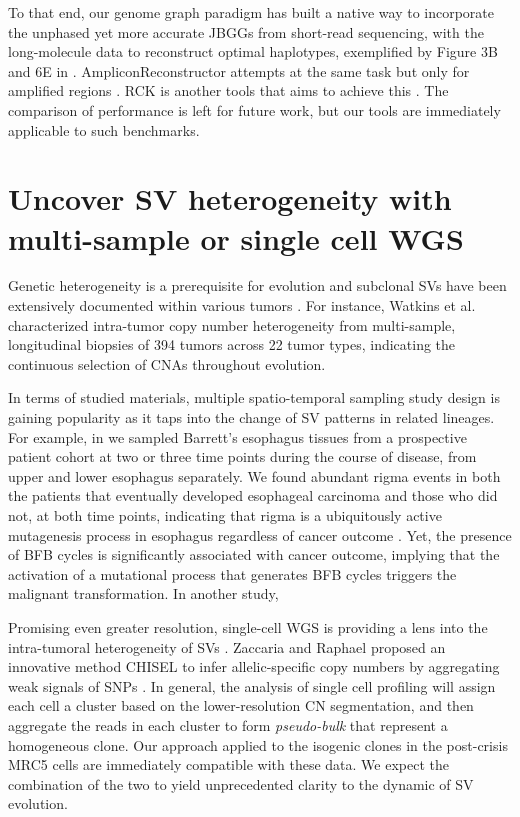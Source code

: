 \documentclass[phd,tocprelim]{cornell}
\begin{document}
To that end, our genome graph paradigm has built a native way to incorporate the unphased yet more accurate JBGGs from short-read sequencing, with the long-molecule data to reconstruct optimal haplotypes, exemplified by Figure 3B and 6E in \cite{Hadi2020-um}. AmpliconReconstructor attempts at the same task but only for amplified regions \cite{Luebeck2020-ow}. RCK is another tools that aims to achieve this \cite{Aganezov2020-cu}. The comparison of performance is left for future work, but our tools are immediately applicable to such benchmarks.


\section{Uncover SV heterogeneity with multi-sample or single cell WGS}
Genetic heterogeneity is a prerequisite for evolution and subclonal SVs have been extensively documented within various tumors \cite{Watkins2020-qp,Paulson2021-nd}. For instance, Watkins et al. \cite{Watkins2020-qp} characterized intra-tumor copy number heterogeneity from multi-sample, longitudinal biopsies of 394 tumors across 22 tumor types, indicating the continuous selection of CNAs throughout evolution.

In terms of studied materials, multiple spatio-temporal sampling study design is gaining popularity as it taps into the change of SV patterns in related lineages. For example, in \cite{Paulson2021-nd} we sampled Barrett's esophagus tissues from a prospective patient cohort at two or three time points during the course of disease, from upper and lower esophagus separately. We found abundant rigma events in both the patients that eventually developed esophageal carcinoma and those who did not, at both time points, indicating that rigma is a ubiquitously active mutagenesis process in esophagus regardless of cancer outcome \cite{Paulson2021-nd}. Yet, the presence of BFB cycles is significantly associated with cancer outcome, implying that the activation of a mutational process that generates BFB cycles triggers the malignant transformation. In another study, 

Promising even greater resolution, single-cell WGS is providing a lens into the intra-tumoral heterogeneity of SVs \cite{Zaccaria2020-bn,laks2019,Salehi2021-xi}. Zaccaria and Raphael proposed an innovative method CHISEL to infer allelic-specific copy numbers by aggregating weak signals of SNPs . In general, the analysis of single cell profiling will assign each cell a cluster based on the lower-resolution CN segmentation, and then aggregate the reads in each cluster to form \textit{pseudo-bulk} that represent a homogeneous clone. Our approach applied to the isogenic clones in the post-crisis MRC5 cells are immediately compatible with these data. We expect the combination of the two to yield unprecedented clarity to the dynamic of SV evolution.
\end{document}
